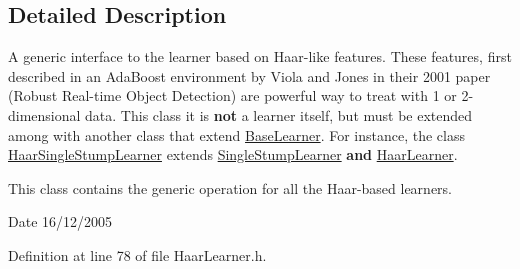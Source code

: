 \subsection{Detailed Description}
A generic interface to the learner based on Haar-\/like features. These features, first described in an AdaBoost environment by Viola and Jones in their 2001 paper (Robust Real-\/time Object Detection) are powerful way to treat with 1 or 2-\/dimensional data. This class it is {\bfseries not} a learner itself, but must be extended among with another class that extend \hyperlink{classMultiBoost_1_1BaseLearner}{BaseLearner}. For instance, the class \hyperlink{classMultiBoost_1_1HaarSingleStumpLearner}{HaarSingleStumpLearner} extends \hyperlink{classMultiBoost_1_1SingleStumpLearner}{SingleStumpLearner} {\bfseries and} \hyperlink{classMultiBoost_1_1HaarLearner}{HaarLearner}.

This class contains the generic operation for all the Haar-\/based learners. \begin{DoxyDate}{Date}
16/12/2005 
\end{DoxyDate}


Definition at line 78 of file HaarLearner.h.



